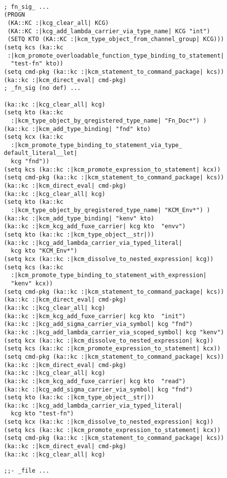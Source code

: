 \begin{lstlisting}[caption={Sample IR Code}, 
  numbers = none, escapechar = !, 
  label={lst:rzd},
    basicstyle = \ttfamily\bfseries\footnotesize, 
	linewidth = 1.01\linewidth]

; fn_sig_ ...
(PROGN
 (KA::KC :|kcg_clear_all| KCG)
 (KA::KC :|kcg_add_lambda_carrier_via_type_name| KCG "int")
 (SETQ KTO (KA::KC :|kcm_type_object_from_channel_group| KCG)))
(setq kcs (ka::kc 
 :|kcm_promote_overloadable_function_type_binding_to_statement| 
  "test-fn" kto))
(setq cmd-pkg (ka::kc :|kcm_statement_to_command_package| kcs))
(ka::kc :|kcm_direct_eval| cmd-pkg)
; _fn_sig (no def) ...

(ka::kc :|kcg_clear_all| kcg)
(setq kto (ka::kc 
  :|kcm_type_object_by_qregistered_type_name| "Fn_Doc*") )
(ka::kc :|kcm_add_type_binding| "fnd" kto)
(setq kcx (ka::kc 
  :|kcm_promote_type_binding_to_statement_via_type_
default_literal__let| 
  kcg "fnd"))
(setq kcs (ka::kc :|kcm_promote_expression_to_statement| kcx))
(setq cmd-pkg (ka::kc :|kcm_statement_to_command_package| kcs))
(ka::kc :|kcm_direct_eval| cmd-pkg)
(ka::kc :|kcg_clear_all| kcg)
(setq kto (ka::kc 
  :|kcm_type_object_by_qregistered_type_name| "KCM_Env*") )
(ka::kc :|kcm_add_type_binding| "kenv" kto)
(ka::kc :|kcm_kcg_add_fuxe_carrier| kcg kto  "envv")
(setq kto (ka::kc :|kcm_type_object__str|))
(ka::kc :|kcg_add_lambda_carrier_via_typed_literal| 
  kcg kto "KCM_Env*")
(setq kcx (ka::kc :|kcm_dissolve_to_nested_expression| kcg))
(setq kcs (ka::kc 
  :|kcm_promote_type_binding_to_statement_with_expression| 
  "kenv" kcx))
(setq cmd-pkg (ka::kc :|kcm_statement_to_command_package| kcs))
(ka::kc :|kcm_direct_eval| cmd-pkg)
(ka::kc :|kcg_clear_all| kcg)
(ka::kc :|kcm_kcg_add_fuxe_carrier| kcg kto  "init")
(ka::kc :|kcg_add_sigma_carrier_via_symbol| kcg "fnd")
(ka::kc :|kcg_add_lambda_carrier_via_scoped_symbol| kcg "kenv")
(setq kcx (ka::kc :|kcm_dissolve_to_nested_expression| kcg))
(setq kcs (ka::kc :|kcm_promote_expression_to_statement| kcx))
(setq cmd-pkg (ka::kc :|kcm_statement_to_command_package| kcs))
(ka::kc :|kcm_direct_eval| cmd-pkg)
(ka::kc :|kcg_clear_all| kcg)
(ka::kc :|kcm_kcg_add_fuxe_carrier| kcg kto  "read")
(ka::kc :|kcg_add_sigma_carrier_via_symbol| kcg "fnd")
(setq kto (ka::kc :|kcm_type_object__str|))
(ka::kc :|kcg_add_lambda_carrier_via_typed_literal| 
  kcg kto "test-fn")
(setq kcx (ka::kc :|kcm_dissolve_to_nested_expression| kcg))
(setq kcs (ka::kc :|kcm_promote_expression_to_statement| kcx))
(setq cmd-pkg (ka::kc :|kcm_statement_to_command_package| kcs))
(ka::kc :|kcm_direct_eval| cmd-pkg)
(ka::kc :|kcg_clear_all| kcg)

;;- _file ...

\end{lstlisting}


